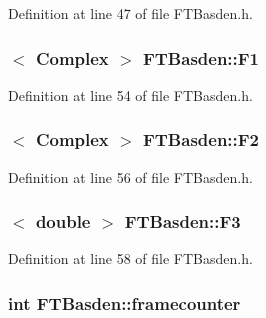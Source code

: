 Definition at line 47 of file FTBasden.h.

\hypertarget{classFTBasden_aabfa0e2dc66143dfdf26316c1b545eef}{
\subsubsection[{F1}]{$<$ {\bf Complex} $>$ {\bf FTBasden::F1}}}
\label{classFTBasden_aabfa0e2dc66143dfdf26316c1b545eef}


Definition at line 54 of file FTBasden.h.

\hypertarget{classFTBasden_a41536d290b26183806301f7601bbeb27}{
\subsubsection[{F2}]{$<$ {\bf Complex} $>$ {\bf FTBasden::F2}}}
\label{classFTBasden_a41536d290b26183806301f7601bbeb27}


Definition at line 56 of file FTBasden.h.

\hypertarget{classFTBasden_ad7ec1f815688a42e02211d7fa98b6a60}{
\subsubsection[{F3}]{$<$ double $>$ {\bf FTBasden::F3}}}
\label{classFTBasden_ad7ec1f815688a42e02211d7fa98b6a60}


Definition at line 58 of file FTBasden.h.

\hypertarget{classFTBasden_ae346f291d45f1d1d99a4f7663c13c2f6}{
\subsubsection[{framecounter}]{\setlength{\rightskip}{0pt plus 5cm}int {\bf FTBasden::framecounter}}}
\label{classFTBasden_ae346f291d45f1d1d99a4f7663c13c2f6}


